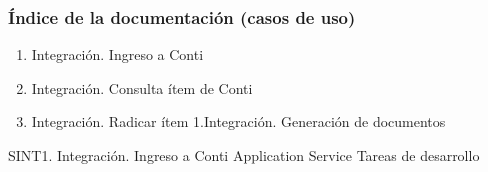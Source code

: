 \documentclass[
  paper=a4,
  ,captions=tableheading
]{scrartcl}
\providecommand{\tightlist}{%
  \setlength{\itemsep}{0pt}\setlength{\parskip}{0pt}}
\begin{document}
\subsubsection{Índice de la documentación (casos de
uso)}\label{sec:uxedndice-de-la-documentaciuxf3n-casos-de-uso-3}

\begin{enumerate}
\def\labelenumi{\arabic{enumi}.}
\tightlist
\item
  Integración. Ingreso a Conti
\item
  Integración. Consulta ítem de Conti
\item
  Integración. Radicar ítem 1.Integración. Generación de documentos
\end{enumerate}

\textbar{} \textbar{} SINT1. Integración. Ingreso a Conti \textbar{}
Application Service \textbar{} Tareas de desarrollo
\end{document}
